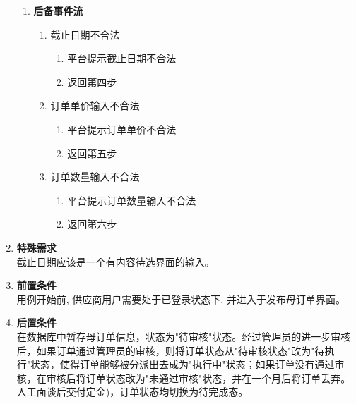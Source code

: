 \begin{enumerate}
\begin{enumerate}
        \item \textbf{后备事件流}
        \begin{enumerate}
            \item 截止日期不合法
            \begin{enumerate}
                \item 平台提示截止日期不合法
                \item 返回第四步
            \end{enumerate}

            \item 订单单价输入不合法
            \begin{enumerate}
                \item 平台提示订单单价不合法
                \item 返回第五步
            \end{enumerate}

            \item 订单数量输入不合法
            \begin{enumerate}
                \item 平台提示订单数量输入不合法
                \item 返回第六步
            \end{enumerate}
        \end{enumerate}
    \end{enumerate}
    \item \textbf{特殊需求} \\ 截止日期应该是一个有内容待选界面的输入。
    \item \textbf{前置条件} \\ 用例开始前, 供应商用户需要处于已登录状态下, 并进入于发布母订单界面。
    \item \textbf{后置条件} \\ 在数据库中暂存母订单信息，状态为"待审核"状态。经过管理员的进一步审核后，如果订单通过管理员的审核，则将订单状态从"待审核状态"改为"待执行"状态，使得订单能够被分派出去成为"执行中"状态；如果订单没有通过审核，在审核后将订单状态改为"未通过审核"状态，并在一个月后将订单丢弃。人工面谈后交付定金)，订单状态均切换为待完成态。
\end{enumerate}



